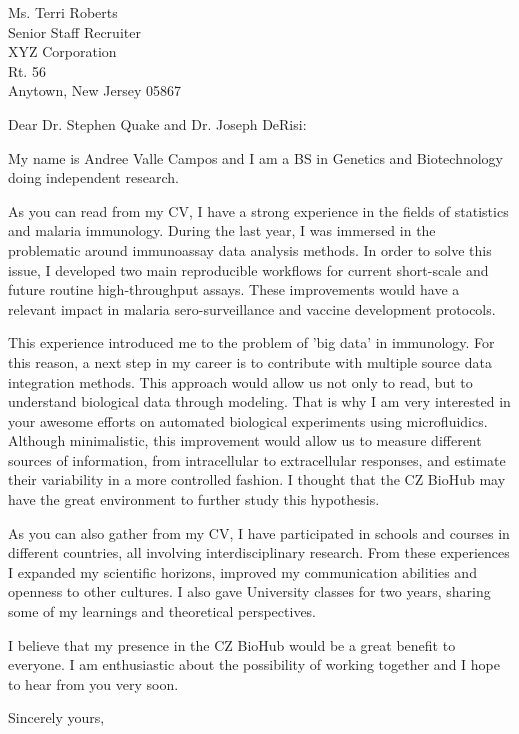 \documentclass{letter} 					%
\begin{document}
\begin{letter}{
		Ms. Terri Roberts \\
		Senior Staff Recruiter \\
		XYZ Corporation \\
		Rt. 56 \\
		Anytown, New Jersey 05867
		}
%

 
\opening{Dear Dr. Stephen Quake and Dr. Joseph DeRisi:} 
 
\noindent 
My name is Andree Valle Campos and I am a BS in Genetics and Biotechnology doing independent research.

\noindent 
As you can read from my CV, I have a strong experience in the fields of statistics and malaria immunology. 
During the last year, I was immersed in the problematic around immunoassay data analysis methods. 
In order to solve this issue, I developed two main reproducible workflows for current short-scale and future routine high-throughput assays. 
These improvements would have a relevant impact in malaria sero-surveillance and vaccine development protocols.

\noindent 
This experience introduced me to the problem of 'big data' in immunology. 
For this reason, a next step in my career is to contribute with multiple source data integration methods. 
This approach would allow us not only to read, but to understand biological data through modeling. 
That is why I am very interested in your awesome efforts on automated biological experiments using microfluidics. 
Although minimalistic, this improvement would allow us to measure different sources of information, 
from intracellular to extracellular responses, and estimate their variability in a more controlled fashion. 
I thought that the CZ BioHub may have the great environment to further study this hypothesis.

\noindent 
As you can also gather from my CV, 
I have participated in schools and courses in different countries, all involving interdisciplinary research. 
From these experiences I expanded my scientific horizons, improved my communication abilities and openness to other cultures. 
I also gave University classes for two years, sharing some of my learnings and theoretical perspectives.

\noindent 
I believe that my presence in the CZ BioHub would be a great benefit to everyone. 
I am enthusiastic about the possibility of working together and I hope to hear from you very soon.
 
\closing{Sincerely yours,} 
  
\encl{}  				%


\end{letter}
\end{document}
